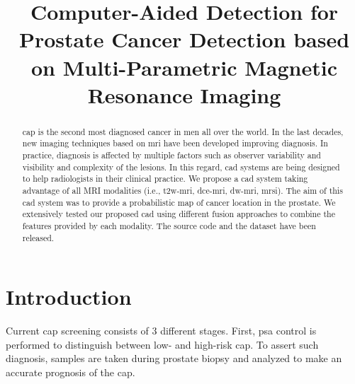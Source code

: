 \documentclass[conference]{sty/ieeeconf}
\begin{document}
\title{Computer-Aided Detection for Prostate Cancer Detection based on Multi-Parametric Magnetic Resonance Imaging}

\author{
}

\maketitle

\begin{abstract}
\Ac{cap} is the second most diagnosed cancer in men all over the world.
In the last decades, new imaging techniques based on \ac{mri} have been developed improving diagnosis.
In practice, diagnosis is affected by multiple factors such as observer variability and visibility and complexity of the lesions.
In this regard, \ac{cad} systems are being designed to help radiologists in their clinical practice.
We propose a \ac{cad} system taking advantage of all MRI modalities (i.e.,
\acs*{t2w}-\acs*{mri}, \acs*{dce}-\acs*{mri}, \ac{dw}-\acs*{mri}, \acs*{mrsi}).
The aim of this \ac{cad} system was to provide a probabilistic map of cancer
location in the prostate.
We extensively tested our proposed \ac{cad} using different fusion approaches
to combine the features provided by each modality.
The source code and the dataset have been released.
\end{abstract}

\acresetall

\section{Introduction}
Current \ac{cap} screening consists of 3 different stages.
First, \ac{psa} control is performed to distinguish between low- and
high-risk \ac{cap}.
To assert such diagnosis, samples are taken during prostate biopsy and
analyzed to make an accurate prognosis of the \ac{cap}.
\end{document}
